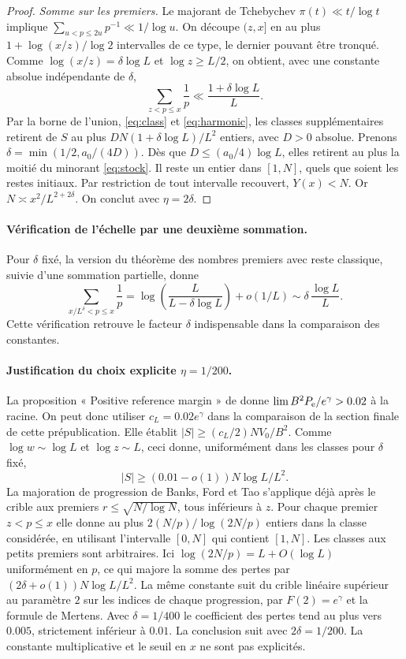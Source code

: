 \documentclass[11pt,a4paper]{article}
\begin{document}
\begin{proof}
\emph{Somme sur les premiers.}
Le majorant de Tchebychev $\pi(t)\ll t/\log t$ implique
$\sum_{u<p\le 2u}p^{-1}\ll1/\log u$.
On découpe $(z,x]$ en au plus $1+\log(x/z)/\log 2$ intervalles
de ce type, le dernier pouvant être tronqué. Comme
$\log(x/z)=\delta\log L$ et $\log z\ge L/2$, on obtient, avec une
constante absolue indépendante de $\delta$,
\begin{equation}\label{eq:harmonic}
            \sum_{z<p\le x}\frac1p \ll \frac{1+\delta\log L}{L}.
\end{equation}
Par la borne de l'union, \eqref{eq:class} et \eqref{eq:harmonic},
les classes supplémentaires retirent de $S$ au plus
$D N(1+\delta\log L)/L^2$ entiers, avec $D>0$ absolue.
Prenons $\delta=\min(1/2,a_0/(4D))$. Dès que
$D\le(a_0/4)\log L$, elles retirent au plus la moitié du minorant
\eqref{eq:stock}. Il reste un entier dans $[1,N]$, quels que soient
les restes initiaux. Par restriction de tout intervalle recouvert,
$Y(x)<N$. Or $N\asymp x^2/L^{2+2\delta}$. On conclut avec
$\eta=2\delta$.
\end{proof}

\paragraph{Vérification de l'échelle par une deuxième sommation.}
Pour $\delta$ fixé, la version du théorème des nombres premiers avec
reste classique, suivie d'une sommation partielle, donne
\[
 \sum_{x/L^\delta<p\le x} \frac1p
   = \log\!\left(\frac{L}{L-\delta\log L}\right)+o(1/L)
   \sim \delta\,\frac{\log L}{L}.
\]
Cette vérification retrouve le facteur $\delta$ indispensable dans la
comparaison des constantes.

\paragraph{Justification du choix explicite $\eta=1/200$.}
La proposition « Positive reference margin » de \cite{survivors}
donne $\lim B^2 P_{\rm e}/e^\gamma>0.02$ à la racine. On peut donc
utiliser $c_L=0.02 e^\gamma$ dans la comparaison de la section finale
de cette prépublication. Elle établit $|S|\ge(c_L/2)NV_0/B^2$.
Comme $\log w\sim\log L$ et $\log z\sim L$, ceci donne, uniformément
dans les classes pour $\delta$ fixé,
\[
   |S|\ge (0.01-o(1))N\log L/L^2 .
\]
La majoration de progression de Banks, Ford et Tao
\cite[section 2.3]{bft} s'applique déjà après le crible aux premiers
$r\le\sqrt{N/\log N}$, tous inférieurs à $z$. Pour chaque premier
$z<p\le x$ elle donne au plus $2(N/p)/\log(2N/p)$ entiers dans la
classe considérée, en utilisant l'intervalle $[0,N]$ qui contient
$[1,N]$. Les classes aux petits premiers sont arbitraires. Ici
$\log(2N/p)=L+O(\log L)$ uniformément en $p$, ce qui majore la somme
des pertes par $(2\delta+o(1))N\log L/L^2$. La même constante suit
du crible linéaire supérieur au paramètre $2$ sur les indices de
chaque progression, par $F(2)=e^\gamma$ et la formule de Mertens.
Avec $\delta=1/400$ le coefficient des pertes tend au plus vers
$0.005$, strictement inférieur à $0.01$. La conclusion suit avec
$2\delta=1/200$. La constante multiplicative et le seuil en $x$ ne
sont pas explicités.
\end{document}
